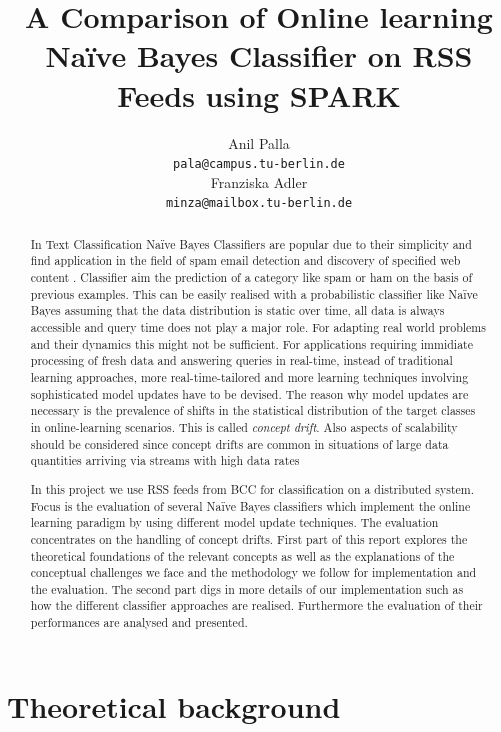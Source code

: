 \documentclass{article} %
\title{A Comparison of Online learning Na\"ive Bayes Classifier on RSS Feeds using SPARK}
\author{
Anil Palla\\
\texttt{pala@campus.tu-berlin.de} \\
\And
Franziska Adler \\
\texttt{minza@mailbox.tu-berlin.de} \\
}
\begin{document}
\maketitle

\begin{abstract}
In Text Classification Na\"ive Bayes Classifiers are popular due to their simplicity and find application in the field of spam email detection and discovery of specified web content \cite[p. 225]{ertel2008}. Classifier aim the prediction of a category like spam or ham on the basis of previous examples. This can be easily realised with a probabilistic classifier like Na\"ive Bayes assuming that the data distribution is static over time, all data is always accessible and query time does not play a major role. For adapting real world problems and their dynamics this might not be sufficient. For applications requiring immidiate processing of fresh data and answering queries in real-time, instead of traditional learning approaches, more real-time-tailored and more learning techniques involving sophisticated model updates have to be devised. The reason why model updates are necessary is the prevalence of shifts in the statistical distribution of the target classes in online-learning scenarios. This is called \textit{concept drift}. Also aspects of scalability should be considered since concept drifts are common in situations of large data quantities arriving via streams with high data rates \cite[p. 4]{tsymbal2004}   

In this project we use RSS feeds from BCC for classification on a distributed system. Focus is the evaluation of several Na\"ive Bayes classifiers which implement the online learning paradigm by using different model update techniques.  The evaluation concentrates on the handling of concept drifts. First part of this report explores the theoretical foundations of the relevant concepts as well as the explanations of the conceptual challenges we face and the methodology we follow for implementation and the evaluation. The second part digs in more details of our implementation such as how the different classifier approaches are realised. Furthermore the evaluation of their performances are analysed and presented.

\end{abstract}

\section{Theoretical background}
\end{document}
